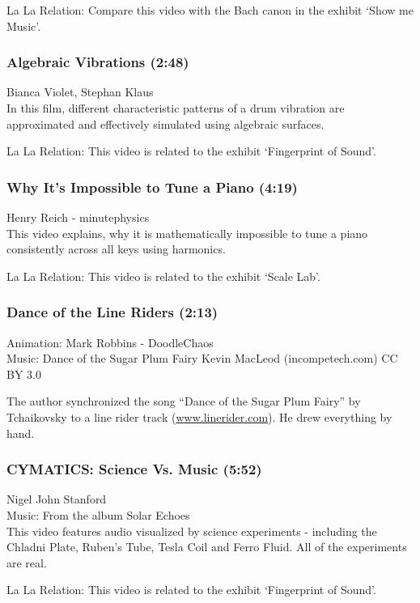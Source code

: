 La La Relation: Compare this video with the Bach canon in the exhibit `Show me Music'.

\subsubsection*{Algebraic Vibrations (2:48)}
Bianca Violet, Stephan Klaus\\

In this film, different characteristic patterns of a drum vibration are approximated and effectively simulated using algebraic surfaces.

La La Relation: This video is related to the exhibit `Fingerprint of Sound'.

\subsubsection*{Why It's Impossible to Tune a Piano (4:19)}
Henry Reich - minutephysics\\

This video explains, why it is mathematically impossible to tune a piano consistently across all keys using harmonics.

La La Relation: This video is related to the exhibit `Scale Lab'.

\subsubsection*{Dance of the Line Riders (2:13)}
Animation: Mark Robbins - DoodleChaos \\
Music: Dance of the Sugar Plum Fairy Kevin MacLeod (incompetech.com) CC BY 3.0

The author synchronized the song ``Dance of the Sugar Plum Fairy'' by Tchaikovsky to a line rider track (\url{www.linerider.com}). He drew everything by hand.

\subsubsection*{CYMATICS: Science Vs. Music (5:52)}
Nigel John Stanford \\
Music: From the album Solar Echoes\\

This video features audio visualized by science experiments - including the Chladni Plate, Ruben's Tube, Tesla Coil and Ferro Fluid. All of the experiments are real.

La La Relation: This video is related to the exhibit `Fingerprint of Sound'.

